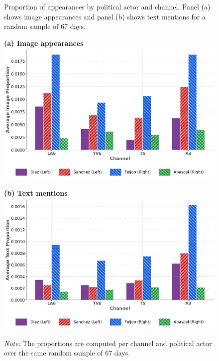 \documentclass[12pt]{article}
\begin{document}
\begin{figure}[htbp!]
	\centering
	\caption{Proportion of appearances by political actor and channel. Panel (a) shows image appearances and panel (b) shows text mentions for a random sample of 67 days.}
	
	\begin{minipage}{0.48\textwidth}
		\centering
		\textbf{(a) Image appearances}\\[1ex]
		\includegraphics[width=\linewidth]{figures/politicians_image_proportions}
	\end{minipage}%
	\hfill
	\begin{minipage}{0.48\textwidth}
		\centering
		\textbf{(b) Text mentions}\\[1ex]
		\includegraphics[width=\linewidth]{figures/politicians_text_proportions}
	\end{minipage}
	
	\vspace{1ex}
	
	\caption*{\small
		\textit{Note:} The proportions are computed per channel and political actor over the same random sample of 67 days.}
	\label{fig:combined_channel}
\end{figure}
\end{document}
